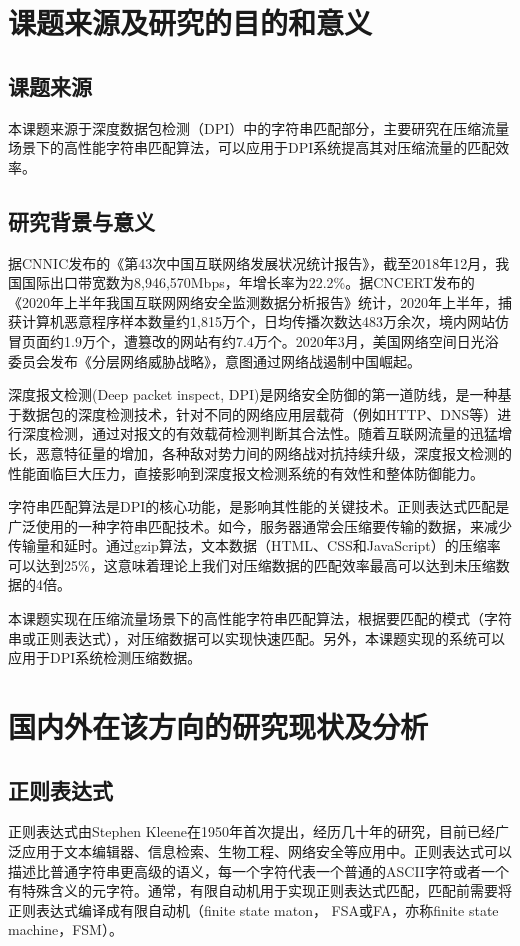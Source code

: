 
\section{课题来源及研究的目的和意义}
\subsection{课题来源}
本课题来源于深度数据包检测（DPI）中的字符串匹配部分，主要研究在压缩流量场景下的高性能字符串匹配算法，可以应用于DPI系统提高其对压缩流量的匹配效率。

\vspace{3mm}
\subsection{研究背景与意义}
据CNNIC发布的《第43次中国互联网络发展状况统计报告》，截至2018年12月，我国国际出口带宽数为8,946,570Mbps，年增长率为22.2\%。据CNCERT发布的《2020年上半年我国互联网网络安全监测数据分析报告》统计，2020年上半年，捕获计算机恶意程序样本数量约1,815万个，日均传播次数达483万余次，境内网站仿冒页面约1.9万个，遭篡改的网站有约7.4万个。2020年3月，美国网络空间日光浴委员会发布《分层网络威胁战略》，意图通过网络战遏制中国崛起。

深度报文检测(Deep packet inspect, DPI)是网络安全防御的第一道防线，是一种基于数据包的深度检测技术，针对不同的网络应用层载荷（例如HTTP、DNS等）进行深度检测，通过对报文的有效载荷检测判断其合法性。随着互联网流量的迅猛增长，恶意特征量的增加，各种敌对势力间的网络战对抗持续升级，深度报文检测的性能面临巨大压力，直接影响到深度报文检测系统的有效性和整体防御能力。 

字符串匹配算法是DPI的核心功能，是影响其性能的关键技术。正则表达式匹配是广泛使用的一种字符串匹配技术。如今，服务器通常会压缩要传输的数据，来减少传输量和延时。通过gzip算法\cite{RFC1952}，文本数据（HTML、CSS和JavaScript）的压缩率可以达到25\%，这意味着理论上我们对压缩数据的匹配效率最高可以达到未压缩数据的4倍。

本课题实现在压缩流量场景下的高性能字符串匹配算法，根据要匹配的模式（字符串或正则表达式），对压缩数据可以实现快速匹配。另外，本课题实现的系统可以应用于DPI系统检测压缩数据。
\vspace{8mm}
\section{国内外在该方向的研究现状及分析}

\vspace{3mm}
\subsection{正则表达式}
正则表达式由Stephen Kleene\cite{kleene2016representation}在1950年首次提出，经历几十年的研究，目前已经广泛应用于文本编辑器、信息检索、生物工程、网络安全等应用中。正则表达式可以描述比普通字符串更高级的语义，每一个字符代表一个普通的ASCII字符或者一个有特殊含义的元字符。通常，有限自动机用于实现正则表达式匹配，匹配前需要将正则表达式编译成有限自动机（finite state maton， FSA或FA，亦称finite state machine，FSM）。 

